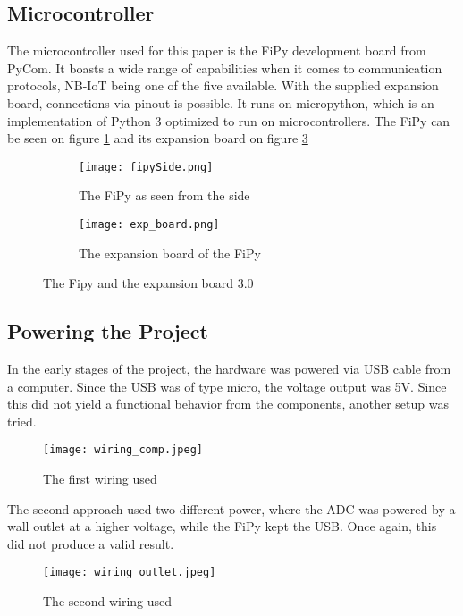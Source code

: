 \subsection{Microcontroller}
The microcontroller used for this paper is the FiPy development board from PyCom. It boasts a wide range of capabilities when it comes to communication protocols, NB-IoT being one of the five available.\cite{fipy-docs} With the supplied expansion board, connections via pinout is possible. It runs on micropython, which is an implementation of Python 3 optimized to run on microcontrollers.\cite{micropython} The FiPy can be seen on figure \ref{fig:fipySide} and its expansion board on figure \ref{fig:exp_board}
\begin{figure}[H]
\begin{subfigure}{0.5\textwidth}
	\centering
	\texttt{[image: fipySide.png]}
	\caption{The FiPy as seen from the side}
	\label{fig:fipySide}
\end{subfigure}
%
\begin{subfigure}{0.5\textwidth}
	\centering
	\texttt{[image: exp\_board.png]}
	\caption{The expansion board of the FiPy}
	\label{fig:exp_board}
\end{subfigure}
\caption{The Fipy and the expansion board 3.0}
\end{figure}

\subsection{Powering the Project}
In the early stages of the project, the hardware was powered via USB cable from a computer. Since the USB was of type micro, the voltage output was 5V. Since this did not yield a functional behavior from the components, another setup was tried.
\begin{figure}[h]
	\centering
	\texttt{[image: wiring\_comp.jpeg]}
	\caption{The first wiring used\cite{lucid-chart}}
	\label{fig:wiring_comp}
\end{figure}

The second approach used two different power, where the ADC was powered by a wall outlet at a higher voltage, while the FiPy kept the USB. Once again, this did not produce a valid result.
\begin{figure}[H]
	\centering
	\texttt{[image: wiring\_outlet.jpeg]}
	\caption{The second wiring used\cite{lucid-chart}}
	\label{fig:wiring_outlet}
\end{figure}


